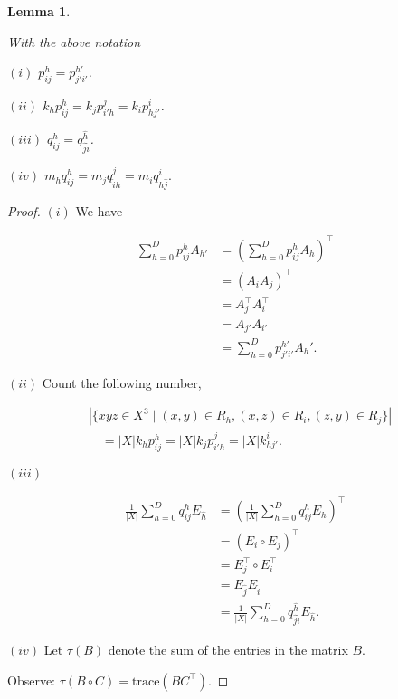\documentclass[
]{book}
\newtheorem{lemma}{Lemma}[chapter]
\theoremstyle{definition}
\theoremstyle{definition}
\theoremstyle{definition}
\theoremstyle{definition}
\theoremstyle{remark}
\begin{document}
\begin{lemma}
\protect\hypertarget{lem:phijqhij}{}\label{lem:phijqhij}

With the above notation

\((i)\) \(p^h_{ij} = p^{h'}_{j'i'}\).

\((ii)\) \(k_hp^h_{ij} = k_jp^j_{i'h} = k_ip^i_{hj'}\).

\((iii)\) \(q^h_{ij} = q^{\hat{h}}_{\hat{j}\hat{i}}\).

\((iv)\) \(m_hq^h_{ij} = m_jq^j_{\hat{i}h} = m_iq^i_{h\hat{j}}.\)

\end{lemma}

\begin{proof}
\leavevmode

\((i)\) We have

\begin{align}
\sum_{h = 0}^D p^h_{ij} A_{h'} & = \left(\sum_{h=0}^D p^h_{ij}A_h\right)^\top \\
 & = (A_iA_j)^\top  \\
& = A_j^\top A_i^\top\\
& = A_{j'}A_{i'} \\
& = \sum_{h=0}^D p^{h'}_{j'i'}A_h'.
\end{align}

\((ii)\) Count the following number,

\begin{align} 
& |\{xyz\in X^3 \mid (x,y)\in R_h, (x,z)\in R_i, (z,y)\in R_j\}| \\
& \quad =  |X|k_hp^h_{ij} = |X|k_jp^j_{i'h} = |X|k^i_{hj'}.
\end{align}

\((iii)\)

\begin{align}
\frac{1}{|X|}\sum_{h = 0}^D q^h_{ij} E_{\hat{h}} & = \left(\frac{1}{|X|}\sum_{h=0}^D q^h_{ij}E_h\right)^\top \\
 & = (E_i\circ E_j)^\top  \\
& = E_j^\top \circ E_i^\top\\
& = E_{\hat{j}}E_{\hat{i}} \\
& = \frac{1}{|X|}\sum_{h=0}^D q^{\hat{h}}_{\hat{j}\hat{i}}E_{\hat{h}}.
\end{align}

\((iv)\) Let \(\tau(B)\) denote the sum of the entries in the matrix \(B\).

Observe: \(\tau(B\circ C) = \mathrm{trace}(BC^\top)\).


\end{proof}
\end{document}
